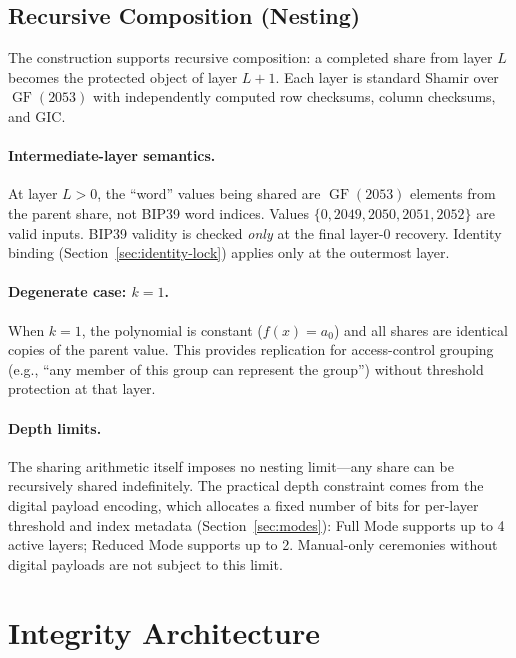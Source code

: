 \documentclass[11pt]{article}
\newcommand{\GF}{\operatorname{GF}}
\begin{document}
\subsection{Recursive Composition (Nesting)}
\label{sec:nesting}

The construction supports recursive composition: a completed share from layer $L$ becomes the protected object of layer $L+1$. Each layer is standard Shamir over $\GF(2053)$ with independently computed row checksums, column checksums, and GIC.

\paragraph{Intermediate-layer semantics.} At layer $L > 0$, the ``word'' values being shared are $\GF(2053)$ elements from the parent share, not BIP39 word indices. Values $\{0, 2049, 2050, 2051, 2052\}$ are valid inputs. BIP39 validity is checked \emph{only} at the final layer-0 recovery. Identity binding (Section~\ref{sec:identity-lock}) applies only at the outermost layer.

\paragraph{Degenerate case: $k = 1$.} When $k = 1$, the polynomial is constant ($f(x) = a_0$) and all shares are identical copies of the parent value. This provides replication for access-control grouping (e.g., ``any member of this group can represent the group'') without threshold protection at that layer.

\paragraph{Depth limits.} The sharing arithmetic itself imposes no nesting limit---any share can be recursively shared indefinitely. The practical depth constraint comes from the digital payload encoding, which allocates a fixed number of bits for per-layer threshold and index metadata (Section~\ref{sec:modes}): Full Mode supports up to 4 active layers; Reduced Mode supports up to 2. Manual-only ceremonies without digital payloads are not subject to this limit.

\section{Integrity Architecture}
\label{sec:integrity}
\end{document}
